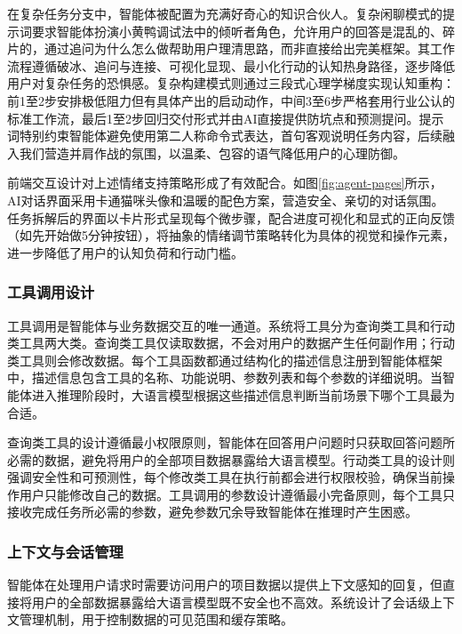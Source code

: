 \par 在复杂任务分支中，智能体被配置为充满好奇心的知识合伙人。复杂闲聊模式的提示词要求智能体扮演小黄鸭调试法中的倾听者角色，允许用户的回答是混乱的、碎片的，通过追问为什么怎么做帮助用户理清思路，而非直接给出完美框架。其工作流程遵循破冰、追问与连接、可视化显现、最小化行动的认知热身路径，逐步降低用户对复杂任务的恐惧感。复杂构建模式则通过三段式心理学梯度实现认知重构：前1至2步安排极低阻力但有具体产出的启动动作，中间3至6步严格套用行业公认的标准工作流，最后1至2步回归交付形式并由AI直接提供防坑点和预测提问。提示词特别约束智能体避免使用第二人称命令式表达，首句客观说明任务内容，后续融入我们营造并肩作战的氛围，以温柔、包容的语气降低用户的心理防御。

\par 前端交互设计对上述情绪支持策略形成了有效配合。如图\ref{fig:agent-pages}所示，AI对话界面采用卡通猫咪头像和温暖的配色方案，营造安全、亲切的对话氛围。任务拆解后的界面以卡片形式呈现每个微步骤，配合进度可视化和显式的正向反馈（如先开始做5分钟按钮），将抽象的情绪调节策略转化为具体的视觉和操作元素，进一步降低了用户的认知负荷和行动门槛。

\subsubsection{工具调用设计}

\par 工具调用是智能体与业务数据交互的唯一通道。系统将工具分为查询类工具和行动类工具两大类。查询类工具仅读取数据，不会对用户的数据产生任何副作用；行动类工具则会修改数据。每个工具函数都通过结构化的描述信息注册到智能体框架中，描述信息包含工具的名称、功能说明、参数列表和每个参数的详细说明。当智能体进入推理阶段时，大语言模型根据这些描述信息判断当前场景下哪个工具最为合适。

\par 查询类工具的设计遵循最小权限原则，智能体在回答用户问题时只获取回答问题所必需的数据，避免将用户的全部项目数据暴露给大语言模型。行动类工具的设计则强调安全性和可预测性，每个修改类工具在执行前都会进行权限校验，确保当前操作用户只能修改自己的数据。工具调用的参数设计遵循最小完备原则，每个工具只接收完成任务所必需的参数，避免参数冗余导致智能体在推理时产生困惑。

\subsubsection{上下文与会话管理}

\par 智能体在处理用户请求时需要访问用户的项目数据以提供上下文感知的回复，但直接将用户的全部数据暴露给大语言模型既不安全也不高效。系统设计了会话级上下文管理机制，用于控制数据的可见范围和缓存策略。

